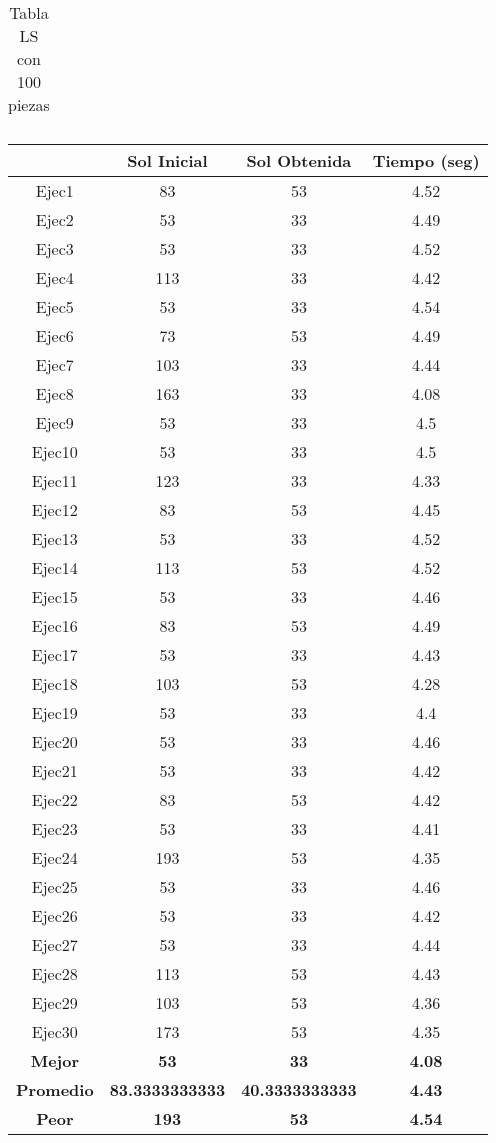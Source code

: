 \begin{center}
\begin{table}
\begin{tabular}{|c|c|c|c|}
\end{tabular}
\caption{Tabla LS con 100 piezas}
\end{table}

\begin{table}

\begin{tabular}{|c|c|c|c|}

\hline
 & {\bf Sol Inicial} & {\bf Sol Obtenida} & {\bf Tiempo (seg)} \\
\hline
Ejec1 & 83 & 53  & 4.52 \\
\hline
Ejec2 & 53 & 33  & 4.49 \\
\hline
Ejec3 & 53 & 33  & 4.52 \\
\hline
Ejec4 & 113 & 33  & 4.42 \\
\hline
Ejec5 & 53 & 33  & 4.54 \\
\hline
Ejec6 & 73 & 53  & 4.49 \\
\hline
Ejec7 & 103 & 33  & 4.44 \\
\hline
Ejec8 & 163 & 33  & 4.08 \\
\hline
Ejec9 & 53 & 33  & 4.5 \\
\hline
Ejec10 & 53 & 33  & 4.5 \\
\hline
Ejec11 & 123 & 33  & 4.33 \\
\hline
Ejec12 & 83 & 53  & 4.45 \\
\hline
Ejec13 & 53 & 33  & 4.52 \\
\hline
Ejec14 & 113 & 53  & 4.52 \\
\hline
Ejec15 & 53 & 33  & 4.46 \\
\hline
Ejec16 & 83 & 53  & 4.49 \\
\hline
Ejec17 & 53 & 33  & 4.43 \\
\hline
Ejec18 & 103 & 53  & 4.28 \\
\hline
Ejec19 & 53 & 33  & 4.4 \\
\hline
Ejec20 & 53 & 33  & 4.46 \\
\hline
Ejec21 & 53 & 33  & 4.42 \\
\hline
Ejec22 & 83 & 53  & 4.42 \\
\hline
Ejec23 & 53 & 33  & 4.41 \\
\hline
Ejec24 & 193 & 53  & 4.35 \\
\hline
Ejec25 & 53 & 33  & 4.46 \\
\hline
Ejec26 & 53 & 33  & 4.42 \\
\hline
Ejec27 & 53 & 33  & 4.44 \\
\hline
Ejec28 & 113 & 53  & 4.43 \\
\hline
Ejec29 & 103 & 53  & 4.36 \\
\hline
Ejec30 & 173 & 53  & 4.35 \\
\hline
{\bf Mejor} & {\bf 53} & {\bf 33} & {\bf 4.08} \\
\hline
{\bf Promedio} & {\bf 83.3333333333} & {\bf 40.3333333333} & {\bf 4.43} \\
\hline
{\bf Peor} & {\bf 193} & {\bf 53} & {\bf 4.54} \\
\hline


\end{tabular}
\end{table}
\end{center}

